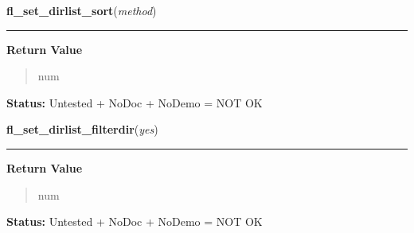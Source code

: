     \label{xformslib:flfilesys:fl_set_dirlist_sort}

    \vspace{0.5ex}

\hspace{.8\funcindent}\begin{boxedminipage}{\funcwidth}

    \raggedright \textbf{fl\_set\_dirlist\_sort}(\textit{method})

    \vspace{-1.5ex}

    \rule{\textwidth}{0.5\fboxrule}
\setlength{\parskip}{2ex}
\setlength{\parskip}{1ex}
      \textbf{Return Value}
    \vspace{-1ex}

      \begin{quote}
      num

      \end{quote}

\textbf{Status:} Untested + NoDoc + NoDemo = NOT OK



    \end{boxedminipage}

    \label{xformslib:flfilesys:fl_set_dirlist_filterdir}

    \vspace{0.5ex}

\hspace{.8\funcindent}\begin{boxedminipage}{\funcwidth}

    \raggedright \textbf{fl\_set\_dirlist\_filterdir}(\textit{yes})

    \vspace{-1.5ex}

    \rule{\textwidth}{0.5\fboxrule}
\setlength{\parskip}{2ex}
\setlength{\parskip}{1ex}
      \textbf{Return Value}
    \vspace{-1ex}

      \begin{quote}
      num

      \end{quote}

\textbf{Status:} Untested + NoDoc + NoDemo = NOT OK



    \end{boxedminipage}

